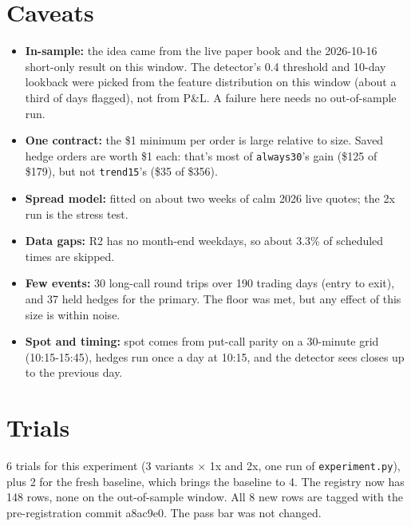 \documentclass{article}
\begin{document}
\section{Caveats}

\begin{itemize}

\item \textbf{In-sample:} the idea came from the live paper book and the 2026-10-16 short-only result on this window. The detector's 0.4 threshold and 10-day lookback were picked from the feature distribution on this window (about a third of days flagged), not from P\&L. A failure here needs no out-of-sample run.

\item \textbf{One contract:} the \$1 minimum per order is large relative to size. Saved hedge orders are worth \$1 each: that's most of \texttt{always30}'s gain (\$125 of \$179), but not \texttt{trend15}'s (\$35 of \$356).

\item \textbf{Spread model:} fitted on about two weeks of calm 2026 live quotes; the 2x run is the stress test.

\item \textbf{Data gaps:} R2 has no month-end weekdays, so about 3.3\% of scheduled times are skipped.

\item \textbf{Few events:} 30 long-call round trips over 190 trading days (entry to exit), and 37 held hedges for the primary. The floor was met, but any effect of this size is within noise.

\item \textbf{Spot and timing:} spot comes from put-call parity on a 30-minute grid (10:15-15:45), hedges run once a day at 10:15, and the detector sees closes up to the previous day.

\end{itemize}

\section{Trials}

6 trials for this experiment (3 variants \ensuremath{\times} 1x and 2x, one run of \texttt{experiment.\allowbreak{}py}), plus 2 for the fresh baseline, which brings the baseline to 4. The registry now has 148 rows, none on the out-of-sample window. All 8 new rows are tagged with the pre-registration commit a8ac9e0. The pass bar was not changed.
\end{document}
